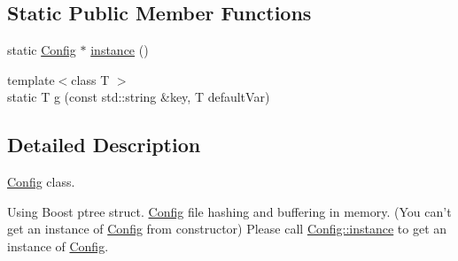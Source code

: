 \subsection*{Static Public Member Functions}
\begin{DoxyCompactItemize}
\item 
static \hyperlink{class_config}{Config} $\ast$ \hyperlink{class_config_abf1d4539011ef83cac0fef2ac864a3a9}{instance} ()
\item 
{\footnotesize template$<$class T $>$ }\\static T \hyperlink{class_config_aaff6aaabead6b7486ec122f9dda807fd}{g} (const std\-::string \&key, T default\-Var)
\end{DoxyCompactItemize}


\subsection{Detailed Description}
\hyperlink{class_config}{Config} class. 

Using Boost ptree struct. \hyperlink{class_config}{Config} file hashing and buffering in memory. (You can't get an instance of \hyperlink{class_config}{Config} from constructor) Please call \hyperlink{class_config_abf1d4539011ef83cac0fef2ac864a3a9}{Config\-::instance} to get an instance of \hyperlink{class_config}{Config}. 

